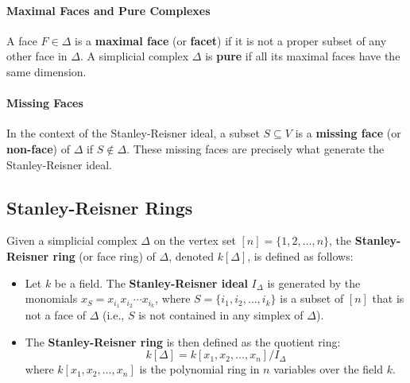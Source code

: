 \documentclass[12pt]{article}
\theoremstyle{definition}
\numberwithin{equation}{subsection}
\begin{document}
\paragraph{Maximal Faces and Pure Complexes}
A face $F \in \Delta$ is a \textbf{maximal face} (or \textbf{facet}) if it is not a proper subset of any other face in $\Delta$.
A simplicial complex $\Delta$ is \textbf{pure} if all its maximal faces have the same dimension.

\paragraph{Missing Faces}
In the context of the Stanley-Reisner ideal, a subset $S \subseteq V$ is a \textbf{missing face} (or \textbf{non-face}) of $\Delta$ if $S \notin \Delta$. These missing faces are precisely what generate the Stanley-Reisner ideal.

\subsection{Stanley-Reisner Rings}
Given a simplicial complex $\Delta$ on the vertex set $[n] = \{1, 2, \ldots, n\}$, the \textbf{Stanley-Reisner ring} (or face ring) of $\Delta$, denoted $k[\Delta]$, is defined as follows:
\begin{itemize}
\item Let $k$ be a field. The \textbf{Stanley-Reisner ideal} $I_\Delta$ is generated by the monomials $x_S = x_{i_1} x_{i_2} \cdots x_{i_k}$, where $S = \{i_1, i_2, \ldots, i_k\}$ is a subset of $[n]$ that is not a face of $\Delta$ (i.e., $S$ is not contained in any simplex of $\Delta$).
\item The \textbf{Stanley-Reisner ring} is then defined as the quotient ring:
\[
k[\Delta] = k[x_1, x_2, \ldots, x_n]/I_\Delta
\]
where $k[x_1, x_2, \ldots, x_n]$ is the polynomial ring in $n$ variables over the field $k$.
\end{itemize}
\end{document}
